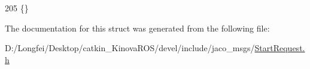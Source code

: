 \begin{DoxyCode}
205   \{\}
\end{DoxyCode}


The documentation for this struct was generated from the following file\+:\begin{DoxyCompactItemize}
\item 
D\+:/\+Longfei/\+Desktop/catkin\+\_\+\+Kinova\+R\+O\+S/devel/include/jaco\+\_\+msgs/\hyperlink{StartRequest_8h}{Start\+Request.\+h}\end{DoxyCompactItemize}
